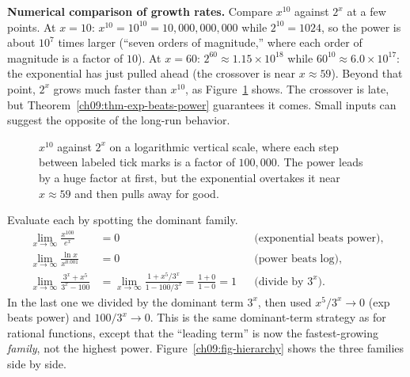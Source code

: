 \begin{labbox}
\textbf{Numerical comparison of growth rates.} Compare $x^{10}$ against $2^x$
at a few points. At $x=10$: $x^{10}=10^{10}=10{,}000{,}000{,}000$ while
$2^{10}=1024$, so the power is about $10^7$ times larger (``seven orders of
magnitude,'' where each order of magnitude is a factor of $10$). At $x=60$:
$2^{60}\approx 1.15\times 10^{18}$ while $60^{10}\approx 6.0\times 10^{17}$: the
exponential has just pulled ahead (the crossover is near $x\approx 59$). Beyond
that point, $2^x$ grows much faster than $x^{10}$, as
Figure~\ref{ch09:fig-crossover} shows.
The crossover is late, but Theorem~\ref{ch09:thm-exp-beats-power} guarantees
it comes. Small inputs can suggest the opposite of the long-run behavior.
\end{labbox}

\begin{figure}[htbp]
\centering
{}
\caption{$x^{10}$ against $2^x$ on a logarithmic vertical scale, where each
step between labeled tick marks is a factor of $100{,}000$. The power leads by a huge factor at
first, but the exponential overtakes it near $x\approx59$ and then pulls away
for good.}
\label{ch09:fig-crossover}
\end{figure}

\begin{example}
\label{ch09:ex-hierarchy}
Evaluate each by spotting the dominant family.
\begin{align*}
\lim_{x\to\infty}\frac{x^{100}}{e^x} &= 0
&&\text{(exponential beats power)},\\
\lim_{x\to\infty}\frac{\ln x}{x^{0.001}} &= 0
&&\text{(power beats log)},\\
\lim_{x\to\infty}\frac{3^x + x^5}{3^x - 100}
&= \lim_{x\to\infty}\frac{1 + x^5/3^x}{1 - 100/3^x}
= \frac{1+0}{1-0}=1
&&\text{(divide by $3^x$)}.
\end{align*}
In the last one we divided by the dominant term $3^x$, then used
$x^5/3^x\to 0$ (exp beats power) and $100/3^x\to 0$. This is the same dominant-term
strategy as for rational functions, except that the ``leading term'' is now the
fastest-growing \emph{family}, not the highest power.
Figure~\ref{ch09:fig-hierarchy} shows the three families side by side.
\end{example}

